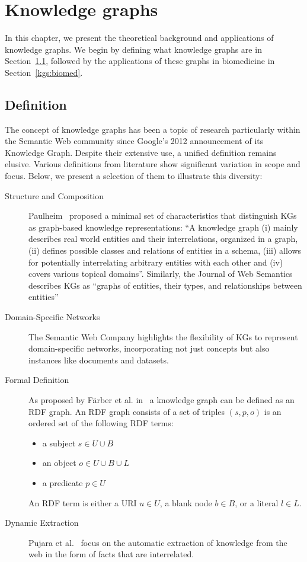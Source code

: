 \chapter{Knowledge graphs}\label{kgs}
In this chapter, we present the theoretical background and applications of knowledge graphs. We begin by defining what knowledge graphs are in Section~\ref{definition}, followed by the applications of these graphs in biomedicine in Section~\ref{kgs:biomed}.

\section{Definition}\label{definition}
The concept of knowledge graphs has been a topic of research particularly within the Semantic Web community since Google's 2012 announcement of its Knowledge Graph. Despite their extensive use, a unified definition remains elusive. Various definitions from literature show significant variation in scope and focus. Below, we present a selection of them to illustrate this diversity:
\begin{description}
    \item[Structure and Composition] Paulheim~\cite{Paulheim2016KnowledgeGR} proposed a minimal set of characteristics that distinguish KGs as graph-based knowledge representations: ``A knowledge graph (i) mainly describes real world entities and their interrelations, organized in a graph, (ii) defines possible classes and relations of entities in a schema, (iii) allows for potentially interrelating arbitrary entities with each other and (iv) covers various topical domains''. Similarly, the Journal of Web Semantics describes KGs as ``graphs of entities, their types, and relationships between entities''~\cite{Kroetsch2016knowledge}
    \item[Domain-Specific Networks] The Semantic Web Company highlights the flexibility of KGs to represent domain-specific networks, incorporating not just concepts but also instances like documents and datasets.~\cite{Blumauer2014knowledge}
    \item[Formal Definition] As proposed by Färber et al. in~\cite{Farber2016linked} a knowledge graph can be defined as an RDF graph. An RDF graph consists of a set of triples $(s, p, o)$ is an ordered set of the following RDF terms: 
    \begin{itemize}
        \item a subject $s\in U \cup B$
        \item an object $o\in U\cup B\cup L$
        \item a predicate $p\in U$
    \end{itemize}
    An RDF term is either a URI $u\in U$, a blank node $b\in B$, or a literal $l\in L$.
    \item[Dynamic Extraction] Pujara et al.~\cite{Pujara2013KGIdentification} focus on the automatic extraction of knowledge from the web in the form of facts that are interrelated.
\end{description}

